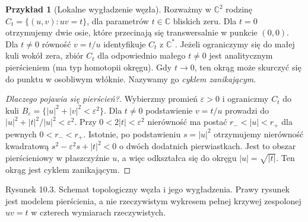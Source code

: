\documentclass[11pt,a4paper,openany]{report}
\numberwithin{equation}{section}
\theoremstyle{plain}
\theoremstyle{definition}
\newtheorem{przyklad}[twierdzenie]{Przykład}
\theoremstyle{remark}
\newcommand{\C}{\mathbb C}
\begin{document}
\begin{przyklad}[Lokalne wygładzenie węzła]
\label{prz:ga10-node}
Rozważmy w $\C^2$ rodzinę $C_t=\{(u,v):uv=t\}$,
dla parametrów $t\in\C$ bliskich zeru.
Dla $t=0$ otrzymujemy dwie osie, które przecinają się
transwersalnie w punkcie $(0,0)$. Dla $t\ne0$
równość $v=t/u$ identyfikuje $C_t$ z $\C^*$.
Jeżeli ograniczymy się do małej kuli wokół zera,
zbiór $C_t$ dla odpowiednio małego $t\ne0$ jest
analitycznym pierścieniem (ma typ homotopii okręgu).
Gdy $t\to0$, ten okrąg może skurczyć się do punktu
w osobliwym włóknie. Nazywamy go \emph{cyklem zanikającym}.
\end{przyklad}

\begin{proof}[Dlaczego pojawia się pierścień?]
Wybierzmy promień $\varepsilon>0$ i ograniczmy $C_t$
do kuli $B_\varepsilon=\{|u|^2+|v|^2<\varepsilon^2\}$.
Dla $t\ne0$ podstawienie $v=t/u$ prowadzi do
$|u|^2+|t|^2/|u|^2<\varepsilon^2$.
Przy $0<2|t|<\varepsilon^2$ nierówność ma postać
$r_-<|u|<r_+$ dla pewnych $0<r_-<r_+$.
Istotnie, po podstawieniu $s=|u|^2$ otrzymujemy
nierówność kwadratową $s^2-\varepsilon^2s+|t|^2<0$
o dwóch dodatnich pierwiastkach.
Jest to obszar pierścieniowy w płaszczyźnie $u$,
a więc odkształca się do okręgu $|u|=\sqrt{|t|}$.
Ten okrąg jest cyklem zanikającym.
\end{proof}

\begin{center}

{\small Rysunek 10.3. Schemat topologiczny węzła i jego wygładzenia.
Prawy rysunek jest modelem pierścienia, a nie rzeczywistym wykresem
pełnej krzywej zespolonej $uv=t$ w czterech wymiarach rzeczywistych.}\par
\end{center}
\end{document}
